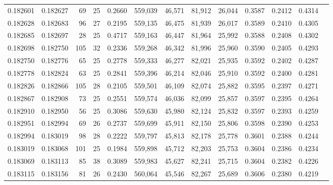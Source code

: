 \begin{tabular}{rrrrrrrrrrrrr}
0.182601 & 0.182627 &  69 &  25 &                                     0.2660 & 559,039 &  46,571 &  81,912 &  26,044 & 0.3587 & 0.2412 & 0.4314 \\
0.182628 & 0.182683 &  96 &  27 &                                     0.2195 & 559,135 &  46,475 &  81,939 &  26,017 & 0.3589 & 0.2410 & 0.4305 \\
0.182685 & 0.182697 &  28 &  25 &                                     0.4717 & 559,163 &  46,447 &  81,964 &  25,992 & 0.3588 & 0.2408 & 0.4302 \\
0.182698 & 0.182750 & 105 &  32 &                                     0.2336 & 559,268 &  46,342 &  81,996 &  25,960 & 0.3590 & 0.2405 & 0.4293 \\
0.182750 & 0.182776 &  65 &  25 &                                     0.2778 & 559,333 &  46,277 &  82,021 &  25,935 & 0.3592 & 0.2402 & 0.4287 \\
0.182778 & 0.182824 &  63 &  25 &                                     0.2841 & 559,396 &  46,214 &  82,046 &  25,910 & 0.3592 & 0.2400 & 0.4281 \\
0.182826 & 0.182866 & 105 &  28 &                                     0.2105 & 559,501 &  46,109 &  82,074 &  25,882 & 0.3595 & 0.2397 & 0.4271 \\
0.182867 & 0.182908 &  73 &  25 &                                     0.2551 & 559,574 &  46,036 &  82,099 &  25,857 & 0.3597 & 0.2395 & 0.4264 \\
0.182910 & 0.182950 &  56 &  25 &                                     0.3086 & 559,630 &  45,980 &  82,124 &  25,832 & 0.3597 & 0.2393 & 0.4259 \\
0.182951 & 0.182994 &  69 &  26 &                                     0.2737 & 559,699 &  45,911 &  82,150 &  25,806 & 0.3598 & 0.2390 & 0.4253 \\
0.182994 & 0.183019 &  98 &  28 &                                     0.2222 & 559,797 &  45,813 &  82,178 &  25,778 & 0.3601 & 0.2388 & 0.4244 \\
0.183019 & 0.183068 & 101 &  25 &                                     0.1984 & 559,898 &  45,712 &  82,203 &  25,753 & 0.3604 & 0.2386 & 0.4234 \\
0.183069 & 0.183113 &  85 &  38 &                                     0.3089 & 559,983 &  45,627 &  82,241 &  25,715 & 0.3604 & 0.2382 & 0.4226 \\
0.183115 & 0.183156 &  81 &  26 &                                     0.2430 & 560,064 &  45,546 &  82,267 &  25,689 & 0.3606 & 0.2380 & 0.4219 \\

\end{tabular}

